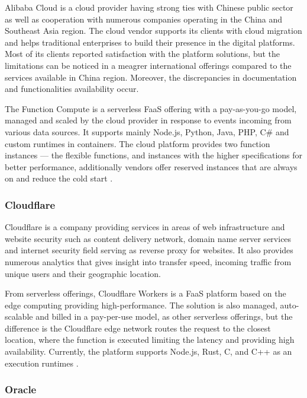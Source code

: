 Alibaba Cloud is a cloud provider having strong ties with Chinese public sector as well as cooperation with numerous companies operating in the China and Southeast Asia region. The cloud vendor supports its clients with cloud migration and helps traditional enterprises to build their presence in the digital platforms. Most of its clients reported satisfaction with the platform solutions, but the limitations can be noticed in a meagrer international offerings compared to the services available in China region. Moreover, the discrepancies in documentation and functionalities availability \cite{Gartner} occur.

The Function Compute is a serverless FaaS offering with a pay-as-you-go model, managed and scaled by the cloud provider in response to events incoming from various data sources. It supports mainly Node.js, Python, Java, PHP, C\# and custom runtimes in containers. The cloud platform provides two function instances --- the flexible functions, and instances with the higher specifications for better performance, additionally vendors offer reserved instances that are always on and reduce the cold start \cite{AlibabaFunctionCompute}.

\subsubsection{Cloudflare}

Cloudflare is a company providing services in areas of web infrastructure and website security such as content delivery network, domain name server services and internet security field serving as reverse proxy for websites. It also provides numerous analytics that gives insight into transfer speed, incoming traffic from unique users and their geographic location.

From serverless offerings, Cloudflare Workers is a FaaS platform based on the edge computing providing high-performance. The solution is also managed, auto-scalable and billed in a pay-per-use model, as other serverless offerings, but the difference is the Cloudflare edge network routes the request to the closest location, where the function is executed limiting the latency and providing high availability. Currently, the platform supports Node.js, Rust, C, and C++ as an execution runtimes \cite{CloudflareWorkers}.

\subsubsection{Oracle}


